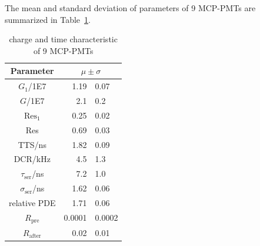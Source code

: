 The mean and standard deviation of parameters of 9 MCP-PMTs are summarized in Table~\ref{tab:summary}.
\begin{table}
    \centering
    \caption{charge and time characteristic of 9 MCP-PMTs}
    \label{tab:summary}
    \begin{tabular}{c| r @{$\pm$} l}
        Parameter&\multicolumn{2}{c}{$\mu\pm\sigma$}\\
        \hline
        $G_1$/1E7&1.19&0.07\\
        $G$/1E7&2.1&0.2\\
        $\mathrm{Res}_1$&0.25&0.02\\
        Res&0.69&0.03\\
        TTS/ns&1.82&0.09\\
        DCR/kHz&4.5&1.3\\
        $\tau_{\mathrm{ser}}$/ns&7.2&1.0\\
        $\sigma_{\mathrm{ser}}$/ns&1.62&0.06\\
        relative PDE&1.71&0.06\\
        $R_{\mathrm{pre}}$&0.0001&0.0002\\
        $R_{\mathrm{after}}$&0.02&0.01\\
        \hline
    \end{tabular}
\end{table}
